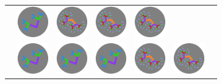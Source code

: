 \documentclass[
  letterpaper,
  DIV=11,
  numbers=noendperiod,
  oneside]{scrreprt}
\begin{document}
\begin{longtable}[]{@{}lllllll@{}}
&
\includegraphics[width=\linewidth,height=0.52083in,keepaspectratio]{images/fractal-low.png}
&
\includegraphics[width=\linewidth,height=0.52083in,keepaspectratio]{images/fractal-high.png}
&
\includegraphics[width=\linewidth,height=0.52083in,keepaspectratio]{images/fractal-high.png}
&
\includegraphics[width=\linewidth,height=0.52083in,keepaspectratio]{images/fractal-high.png} \\
&
\includegraphics[width=\linewidth,height=0.52083in,keepaspectratio]{images/fractal-low.png}
&
\includegraphics[width=\linewidth,height=0.52083in,keepaspectratio]{images/fractal-low.png}
&
\includegraphics[width=\linewidth,height=0.52083in,keepaspectratio]{images/fractal-low.png}
&
\includegraphics[width=\linewidth,height=0.52083in,keepaspectratio]{images/fractal-high.png}
&
\includegraphics[width=\linewidth,height=0.52083in,keepaspectratio]{images/fractal-high.png}

\end{longtable}
\end{document}
